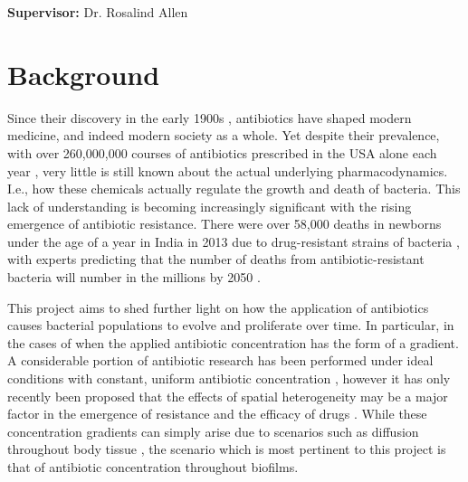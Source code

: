 \documentclass[a4paper,12pt]{article}
\begin{document}
\vfill
{\bf Supervisor:} Dr. Rosalind Allen                %
\newpage
\setcounter{page}{1}                            %
\footruleheight{1pt}
\headruleheight{1pt}
\rhead{- \thepage}
\cfoot{}
%
\tableofcontents                                %
\pagebreak

\section{Background}


Since their discovery in the early 1900s \cite{bioref:first-antibiotics}, antibiotics have shaped modern medicine,
and indeed modern society as a whole.  Yet despite their prevalence, with over 260,000,000 courses of antibiotics prescribed 
in the USA alone each year \cite{bioref:antibiotics-usage-USA-2011}, very little is still known about the actual 
underlying pharmacodynamics.  I.e., how these chemicals actually regulate the growth and death of bacteria.  This 
lack of understanding is becoming increasingly significant with the rising emergence of antibiotic resistance.  
There were over 58,000 deaths in newborns under the age of a year in India in 2013 due to drug-resistant 
strains of bacteria \cite{bioref:india-death-stats}, with experts predicting that the number of deaths from 
antibiotic-resistant bacteria will number in the millions by 2050 \cite{bioref:future-death-stats}.

This project aims to shed further light on how the application of antibiotics causes bacterial populations
to evolve and proliferate over time.  In particular, in the cases of when the applied antibiotic concentration has
the form of a gradient.  A considerable portion of antibiotic research has been performed under ideal conditions
with constant, uniform antibiotic concentration \cite{bioref:Grasso-constant-antibtioic-concn}, however it has only 
recently been proposed that the effects of spatial heterogeneity may be a major factor in the emergence of resistance 
and the efficacy of drugs \cite{bioref:Zhang-effects-of-antibio-grad}.  While these concentration gradients can simply arise 
due to scenarios such as diffusion throughout body tissue \cite{bioref:tissue-antibio-grads}, the scenario which is most pertinent
to this project is that of antibiotic concentration throughout biofilms.
\end{document}
